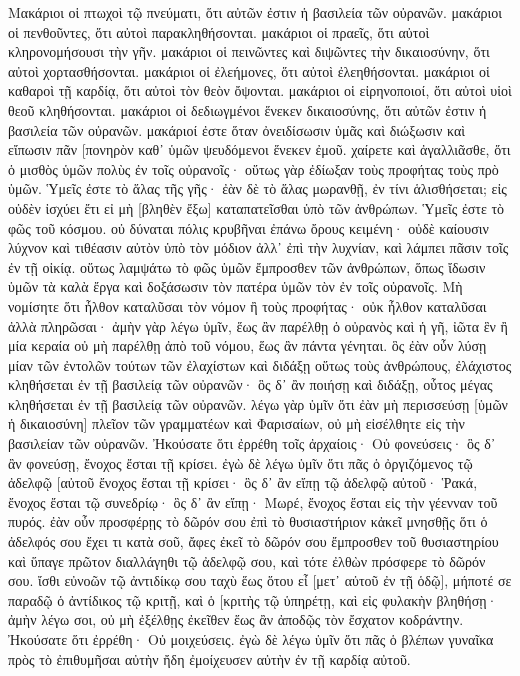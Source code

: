 Μακάριοι οἱ πτωχοὶ τῷ πνεύματι, ὅτι αὐτῶν ἐστιν ἡ βασιλεία τῶν οὐρανῶν. 
μακάριοι οἱ πενθοῦντες, ὅτι αὐτοὶ παρακληθήσονται. 
μακάριοι οἱ πραεῖς, ὅτι αὐτοὶ κληρονομήσουσι τὴν γῆν. 
μακάριοι οἱ πεινῶντες καὶ διψῶντες τὴν δικαιοσύνην, ὅτι αὐτοὶ χορτασθήσονται. 
μακάριοι οἱ ἐλεήμονες, ὅτι αὐτοὶ ἐλεηθήσονται. 
μακάριοι οἱ καθαροὶ τῇ καρδίᾳ, ὅτι αὐτοὶ τὸν θεὸν ὄψονται. 
μακάριοι οἱ εἰρηνοποιοί, ὅτι αὐτοὶ υἱοὶ θεοῦ κληθήσονται. 
μακάριοι οἱ δεδιωγμένοι ἕνεκεν δικαιοσύνης, ὅτι αὐτῶν ἐστιν ἡ βασιλεία τῶν οὐρανῶν. 
μακάριοί ἐστε ὅταν ὀνειδίσωσιν ὑμᾶς καὶ διώξωσιν καὶ εἴπωσιν πᾶν [πονηρὸν καθ᾽ ὑμῶν ψευδόμενοι ἕνεκεν ἐμοῦ. 
χαίρετε καὶ ἀγαλλιᾶσθε, ὅτι ὁ μισθὸς ὑμῶν πολὺς ἐν τοῖς οὐρανοῖς· οὕτως γὰρ ἐδίωξαν τοὺς προφήτας τοὺς πρὸ ὑμῶν. 
Ὑμεῖς ἐστε τὸ ἅλας τῆς γῆς· ἐὰν δὲ τὸ ἅλας μωρανθῇ, ἐν τίνι ἁλισθήσεται; εἰς οὐδὲν ἰσχύει ἔτι εἰ μὴ [βληθὲν ἔξω] καταπατεῖσθαι ὑπὸ τῶν ἀνθρώπων. 
Ὑμεῖς ἐστε τὸ φῶς τοῦ κόσμου. οὐ δύναται πόλις κρυβῆναι ἐπάνω ὄρους κειμένη· 
οὐδὲ καίουσιν λύχνον καὶ τιθέασιν αὐτὸν ὑπὸ τὸν μόδιον ἀλλ᾽ ἐπὶ τὴν λυχνίαν, καὶ λάμπει πᾶσιν τοῖς ἐν τῇ οἰκίᾳ. 
οὕτως λαμψάτω τὸ φῶς ὑμῶν ἔμπροσθεν τῶν ἀνθρώπων, ὅπως ἴδωσιν ὑμῶν τὰ καλὰ ἔργα καὶ δοξάσωσιν τὸν πατέρα ὑμῶν τὸν ἐν τοῖς οὐρανοῖς. 
Μὴ νομίσητε ὅτι ἦλθον καταλῦσαι τὸν νόμον ἢ τοὺς προφήτας· οὐκ ἦλθον καταλῦσαι ἀλλὰ πληρῶσαι· 
ἀμὴν γὰρ λέγω ὑμῖν, ἕως ἂν παρέλθῃ ὁ οὐρανὸς καὶ ἡ γῆ, ἰῶτα ἓν ἢ μία κεραία οὐ μὴ παρέλθῃ ἀπὸ τοῦ νόμου, ἕως ἂν πάντα γένηται. 
ὃς ἐὰν οὖν λύσῃ μίαν τῶν ἐντολῶν τούτων τῶν ἐλαχίστων καὶ διδάξῃ οὕτως τοὺς ἀνθρώπους, ἐλάχιστος κληθήσεται ἐν τῇ βασιλείᾳ τῶν οὐρανῶν· ὃς δ᾽ ἂν ποιήσῃ καὶ διδάξῃ, οὗτος μέγας κληθήσεται ἐν τῇ βασιλείᾳ τῶν οὐρανῶν. 
λέγω γὰρ ὑμῖν ὅτι ἐὰν μὴ περισσεύσῃ [ὑμῶν ἡ δικαιοσύνη] πλεῖον τῶν γραμματέων καὶ Φαρισαίων, οὐ μὴ εἰσέλθητε εἰς τὴν βασιλείαν τῶν οὐρανῶν. 
Ἠκούσατε ὅτι ἐρρέθη τοῖς ἀρχαίοις· Οὐ φονεύσεις· ὃς δ᾽ ἂν φονεύσῃ, ἔνοχος ἔσται τῇ κρίσει. 
ἐγὼ δὲ λέγω ὑμῖν ὅτι πᾶς ὁ ὀργιζόμενος τῷ ἀδελφῷ [αὐτοῦ ἔνοχος ἔσται τῇ κρίσει· ὃς δ᾽ ἂν εἴπῃ τῷ ἀδελφῷ αὐτοῦ· Ῥακά, ἔνοχος ἔσται τῷ συνεδρίῳ· ὃς δ᾽ ἂν εἴπῃ· Μωρέ, ἔνοχος ἔσται εἰς τὴν γέενναν τοῦ πυρός. 
ἐὰν οὖν προσφέρῃς τὸ δῶρόν σου ἐπὶ τὸ θυσιαστήριον κἀκεῖ μνησθῇς ὅτι ὁ ἀδελφός σου ἔχει τι κατὰ σοῦ, 
ἄφες ἐκεῖ τὸ δῶρόν σου ἔμπροσθεν τοῦ θυσιαστηρίου καὶ ὕπαγε πρῶτον διαλλάγηθι τῷ ἀδελφῷ σου, καὶ τότε ἐλθὼν πρόσφερε τὸ δῶρόν σου. 
ἴσθι εὐνοῶν τῷ ἀντιδίκῳ σου ταχὺ ἕως ὅτου εἶ [μετ᾽ αὐτοῦ ἐν τῇ ὁδῷ], μήποτέ σε παραδῷ ὁ ἀντίδικος τῷ κριτῇ, καὶ ὁ [κριτὴς τῷ ὑπηρέτῃ, καὶ εἰς φυλακὴν βληθήσῃ· 
ἀμὴν λέγω σοι, οὐ μὴ ἐξέλθῃς ἐκεῖθεν ἕως ἂν ἀποδῷς τὸν ἔσχατον κοδράντην. 
Ἠκούσατε ὅτι ἐρρέθη· Οὐ μοιχεύσεις. 
ἐγὼ δὲ λέγω ὑμῖν ὅτι πᾶς ὁ βλέπων γυναῖκα πρὸς τὸ ἐπιθυμῆσαι αὐτὴν ἤδη ἐμοίχευσεν αὐτὴν ἐν τῇ καρδίᾳ αὐτοῦ. 
